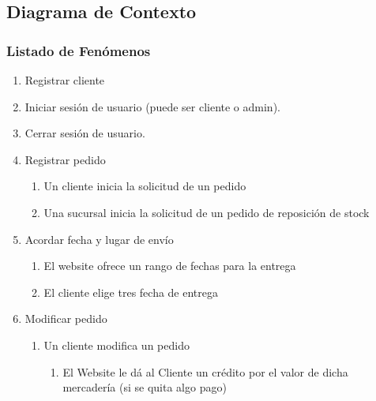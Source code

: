 \subsection{Diagrama de Contexto}

\subsubsection{Listado de Fenómenos}
\begin{enumerate}

  \item Registrar cliente

  \item Iniciar sesión de usuario (puede ser cliente o admin).

  \item Cerrar sesión de usuario.

  \item Registrar pedido

  \begin{enumerate}

    \item Un cliente inicia la solicitud de un pedido

    \item Una sucursal inicia la solicitud de un pedido de reposición de
    stock

  \end{enumerate}

  \item Acordar fecha y lugar de envío

  \begin{enumerate}

    \item El website ofrece un rango de fechas para la entrega

    \item El cliente elige tres fecha de entrega

  \end{enumerate}

  \item Modificar pedido

  \begin{enumerate}

    \item Un cliente modifica un pedido

    \begin{enumerate}

      \item El Website le dá al Cliente un crédito por el valor de dicha
      mercadería (si se quita algo pago)


\end{enumerate}
\end{enumerate}
\end{enumerate}

